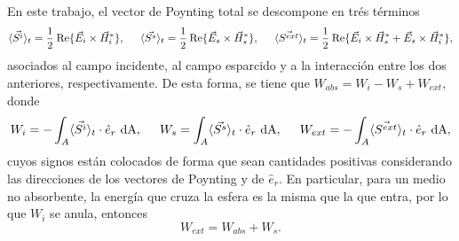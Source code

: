  En este trabajo, el vector de Poynting total se descompone en trés términos \cite{Bohren}
 \begin{equation}
 \langle\Vec{S^i}\rangle_t=  \frac{1}{2}\:\mbox{Re}\{\Vec{E}_i\times\Vec{H}_i^*\}  ,\hspace{0.5cm} \langle\Vec{S^s}\rangle_t=  \frac{1}{2}\:\mbox{Re}\{\Vec{E}_s\times\Vec{H}_s^*\},\hspace{0.5cm} 	\langle\Vec{S^{ext}}\rangle_t= \frac{1}{2}\:\mbox{Re}\{\Vec{E}_i\times\Vec{H}_s^*+\Vec{E}_s\times\Vec{H}_i^*\},
 	\label{S}
 \end{equation}
 asociados al campo incidente, al campo esparcido y a la interacción entre los dos anteriores, respectivamente. De esta forma, se tiene que $W_{abs}=W_i-W_s+W_{ext}$, donde \cite{Bohren}
 \begin{equation}
 	W_i  = -\int_{A}\langle\Vec{S^i}\rangle_t\cdot\hat{e}_r\text{ dA},\hspace{0.5cm} W_s=\int_{A}\langle\Vec{S^s}\rangle_t\cdot\hat{e}_r\text{ dA},\hspace{0.5cm} 	W_{ext} = -\int_{A}\langle\Vec{S^{ext}}\rangle_t\cdot\hat{e}_r\text{ dA},
 	\label{Ws}
 \end{equation}
 cuyos signos están colocados de forma que sean cantidades positivas considerando las direcciones de los vectores de Poynting y de $\hat{e}_r$. En particular, para un medio no absorbente, la energía que cruza la esfera es la misma que la que entra, por lo que $W_i$ se anula, entonces
\begin{equation}
	W_{ext}=W_{abs}+W_s.
\end{equation}


